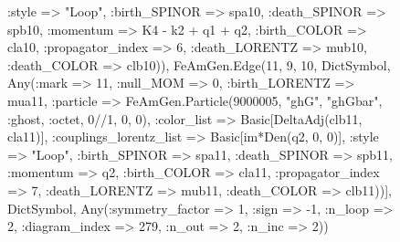 \documentclass{revtex4}
\begin{document}
\begin{figure}[!htb]
\begin{center}
{:style => "Loop", :birth_SPINOR => spa10, :death_SPINOR => spb10, :momentum => K4 - k2 + q1 + q2, :birth_COLOR => cla10, :propagator_index => 6, :death_LORENTZ => mub10, :death_COLOR => clb10)), FeAmGen.Edge(11, 9, 10, Dict{Symbol, Any}(:mark => 11, :null_MOM => 0, :birth_LORENTZ => mua11, :particle => FeAmGen.Particle(9000005, "ghG", "ghGbar", :ghost, :octet, 0//1, 0, 0), :color_list => Basic[DeltaAdj(clb11, cla11)], :couplings_lorentz_list => Basic[im*Den(q2, 0, 0)], :style => "Loop", :birth_SPINOR => spa11, :death_SPINOR => spb11, :momentum => q2, :birth_COLOR => cla11, :propagator_index => 7, :death_LORENTZ => mub11, :death_COLOR => clb11))], Dict{Symbol, Any}(:symmetry_factor => 1, :sign => -1, :n_loop => 2, :diagram_index => 279, :n_out => 2, :n_inc => 2)) 
}
\end{center}
\end{figure}
\end{document}
